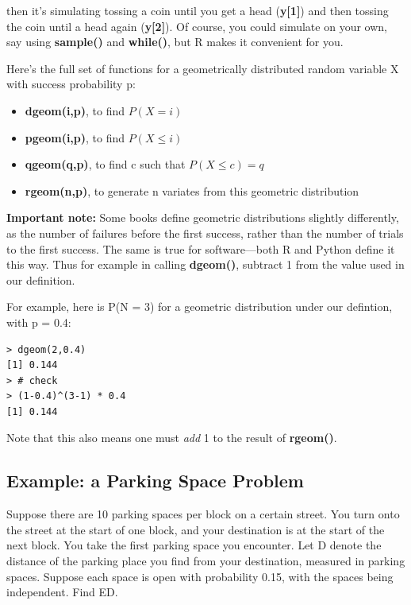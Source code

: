 then it's simulating tossing a coin until you get a head ({\bf y[1]}) and
then tossing the coin until a head again ({\bf y[2]}).  Of course, you
could simulate on your own, say using {\bf sample()} and {\bf while()},
but R makes it convenient for you.

Here's the full set of functions for a geometrically distributed random
variable X with success probability p:

\begin{itemize}

\item {\bf dgeom(i,p)}, to find $P(X = i)$

\item {\bf pgeom(i,p)}, to find $P(X \leq i)$

\item {\bf qgeom(q,p)}, to find c such that $P(X \leq c) = q$

\item {\bf rgeom(n,p)}, to generate n variates from this geometric
distribution

\end{itemize}

{\bf Important note:}  Some books define geometric distributions
slightly differently, as the number of failures before the first
success, rather than the number of trials to the first success.  The
same is true for software---both R and Python define it this way.  Thus
for example in calling {\bf dgeom()}, subtract 1 from the value used in
our definition.

For example, here is P(N = 3) for a geometric distribution under our
defintion, with p = 0.4:

\begin{lstlisting}
> dgeom(2,0.4)
[1] 0.144
> # check
> (1-0.4)^(3-1) * 0.4
[1] 0.144
\end{lstlisting}

Note that this also means one must {\it add} 1 to the result of {\bf
rgeom()}.

\subsection{Example:  a Parking Space Problem}
\label{parking}

Suppose there are 10 parking spaces per block on a certain street.  You
turn onto the street at the start of one block, and your destination is
at the start of the next block.  You take the first parking space you
encounter.  Let D denote the distance of the parking place you find from
your destination, measured in parking spaces.  Suppose each space is
open with probability 0.15, with the spaces being independent.  Find ED.

